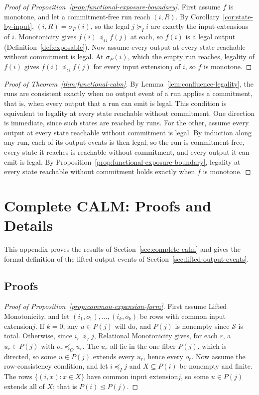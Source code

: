 \documentclass[sigconf]{cidr-2027}
\theoremstyle{remark}
\newcommand{\InputOrd}{\preceq_I}
\newcommand{\OutputOrd}{\preceq_O}
\newcommand{\InputGe}{\succeq_I}
\newcommand{\commitment}{commitment\xspace}
\newcommand{\LiftedOrd}{\trianglelefteq}
\newcommand{\indesc}{input extension\xspace} %
\newcommand{\indescs}{input extensions\xspace}
\newcommand{\outrel}{extends\xspace}          %
\newcommand{\Spec}{\mathcal{S}}
\newcommand{\fiber}[1]{P(#1)}
\begin{document}
\begin{proof}[Proof of Proposition~\ref{prop:functional-exposure-boundary}]
First assume $f$ is monotone, and let a \commitment-free run reach $(i,R)$. By Corollary~\ref{cor:state-by-input}, $(i,R)=\sigma_P(i)$, so the legal
$j\InputGe i$ are exactly the \indescs of $i$. Monotonicity gives
$f(i)\OutputOrd f(j)$ at each, so $f(i)$ is a legal output
(Definition~\ref{def:exposable}). Now assume every output at every state
reachable without \commitment is legal. At $\sigma_P(i)$, which the empty run
reaches, legality of $f(i)$ gives $f(i)\OutputOrd f(j)$ for every \indesc $j$
of $i$, so $f$ is monotone.
\end{proof}

\begin{proof}[Proof of Theorem~\ref{thm:functional-calm}]
By Lemma~\ref{lem:confluence-legality}, the runs are consistent exactly when
no output event of a run applies a \commitment, that is, when every output that
a run can emit is legal. This condition is equivalent to legality at every
state reachable without \commitment. One direction is immediate, since such
states are reached by runs. For the other, assume every output at every
state reachable without \commitment is legal. By induction along any run,
each of its output events is then legal, so the run is \commitment-free, every
state it reaches is reachable without \commitment, and every output it can
emit is legal. By
Proposition~\ref{prop:functional-exposure-boundary}, legality at every state
reachable without \commitment holds exactly when $f$ is monotone.
\end{proof}

\section{Complete CALM: Proofs and Details}
\label{app:proofs-sec3}

This appendix proves the results of Section~\ref{sec:complete-calm} and gives the formal
definition of the lifted output events of Section~\ref{sec:lifted-output-events}.

\subsection{Proofs}

\begin{proof}[Proof of Proposition~\ref{prop:common-expansion-form}]
First assume Lifted Monotonicity, and let $(i_1,o_1),\ldots,(i_k,o_k)$ be
rows with common \indesc $j$. If $k=0$, any $u\in\fiber{j}$ will do, and
$\fiber{j}$ is nonempty since $\Spec$ is total. Otherwise, since
$i_r\InputOrd j$, Relational Monotonicity gives, for each $r$, a
$u_r\in\fiber{j}$ with $o_r\OutputOrd u_r$. The $u_r$ all lie in the one
fiber $\fiber{j}$, which is directed, so some $u\in\fiber{j}$ \outrel every
$u_r$, hence every $o_r$. Now assume the row-consistency condition, and let
$i\InputOrd j$ and $X\subseteq\fiber{i}$ be nonempty and finite. The rows $\{(i,x):x\in X\}$
have common \indesc $j$, so some $u\in\fiber{j}$ \outrel all of $X$; that is
$\fiber{i}\LiftedOrd\fiber{j}$.
\end{proof}
\end{document}
